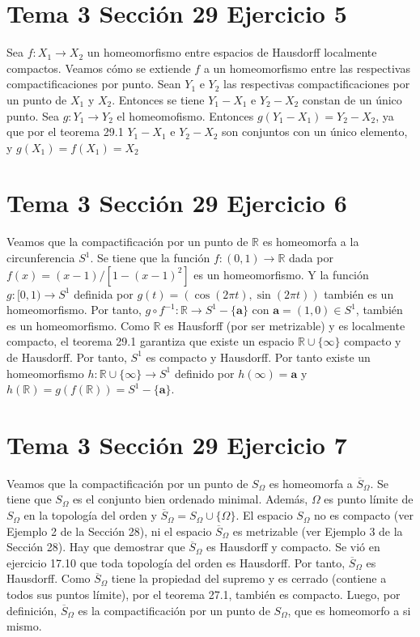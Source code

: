 \documentclass{article}
\newcommand{\vect}[1]{\boldsymbol{#1}}
\begin{document}
\section{Tema 3 Sección 29 Ejercicio 5}
Sea $f:X_1\rightarrow X_2$ un homeomorfismo entre espacios de Hausdorff localmente compactos. Veamos cómo se extiende $f$ a un homeomorfismo entre las respectivas compactificaciones por punto. Sean $Y_1$ e $Y_2$ las respectivas compactificaciones por un punto de $X_1$ y $X_2$. Entonces se tiene $Y_1-X_1$ e $Y_2-X_2$ constan de un único punto. Sea $g:Y_1\rightarrow Y_2$ el homeomofismo. Entonces $g(Y_1-X_1)=Y_2-X_2$, ya que por el teorema 29.1 $Y_1-X_1$  e $Y_2-X_2$ son conjuntos con un único elemento, y $g(X_1)=f(X_1)=X_2$
\section{Tema 3 Sección 29 Ejercicio 6}
Veamos que la compactificación por un punto de $\mathbb{R}$ es homeomorfa a la circunferencia $S^1$. Se tiene que la función $f:(0,1)\rightarrow \mathbb{R}$ dada por $f(x)=(x-1)/[1-(x-1)^2]$ es un homeomorfismo. Y la función $g:[0,1)\rightarrow S^1$ definida por $g(t)=(\cos(2\pi t),\sin(2\pi t))$ también es un homeomorfismo. Por tanto, $g \circ f^{-1} :\mathbb{R}\rightarrow S^1-\{\vect{a}\}$ con $\vect{a}=(1,0)\in S^1$, también es un homeomorfismo. Como $\mathbb{R}$ es Hausforff (por ser metrizable) y es localmente compacto, el teorema 29.1 garantiza que existe un espacio $\mathbb{R}\cup \{\infty\}$ compacto y de Hausdorff. Por tanto, $S^1$ es compacto y Hausdorff. Por tanto existe un homeomorfismo $h:\mathbb{R}\cup\{\infty\}\rightarrow S^1$ definido por $h(\infty)=\vect{a}$ y $h(\mathbb{R})=g(f(\mathbb{R}))=S^1-\{\vect{a}\}$.
\section{Tema 3 Sección 29 Ejercicio 7}
Veamos que la compactificación por un punto de $S_\Omega$ es homeomorfa a $\overline{S}_\Omega$. Se tiene que $S_\Omega$ es el conjunto bien ordenado minimal. Además, $\Omega$ es  punto límite de $S_\Omega$ en la topología del orden y $\overline{S}_\Omega=S_\Omega\cup \{\Omega\}$. El espacio $S_\Omega$ no es compacto (ver Ejemplo 2 de la Sección 28), ni el espacio $\overline{S}_\Omega$ es metrizable (ver Ejemplo 3 de la Sección 28). Hay que demostrar que $\overline{S}_\Omega$ es Hausdorff y compacto. Se vió en ejercicio 17.10 que toda topología del orden es Hausdorff. Por tanto, $\overline{S}_\Omega$ es Hausdorff. Como $\overline{S}_\Omega$ tiene la propiedad del supremo y es cerrado (contiene a todos sus puntos límite), por el teorema 27.1, también es compacto. Luego, por definición, $\overline{S}_\Omega$ es la compactificación por un punto de $S_\Omega$, que es homeomorfo a si mismo.
\end{document}

